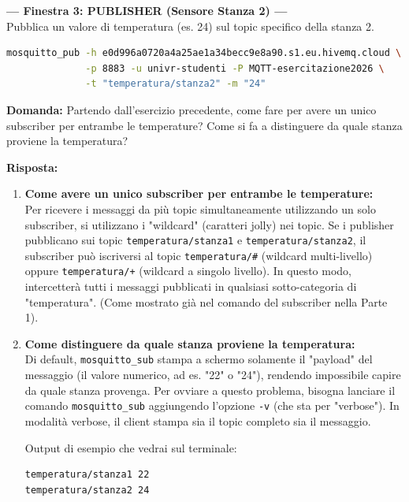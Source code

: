 \documentclass[11pt]{article}
\begin{document}
\begin{tcolorbox}[colback=green!5!white,colframe=green!75!black,title=\textbf{RISPOSTA}, breakable]
\textbf{--- Finestra 3: PUBLISHER (Sensore Stanza 2) ---}\\
Pubblica un valore di temperatura (es. 24) sul topic specifico della stanza 2.
\begin{lstlisting}[language=bash, basicstyle=\ttfamily\small]
mosquitto_pub -h e0d996a0720a4a25ae1a34becc9e8a90.s1.eu.hivemq.cloud \
              -p 8883 -u univr-studenti -P MQTT-esercitazione2026 \
              -t "temperatura/stanza2" -m "24"
\end{lstlisting}

\textbf{Domanda:} Partendo dall'esercizio precedente, come fare per avere un unico subscriber per entrambe le temperature? Come si fa a distinguere da quale stanza proviene la temperatura?

\textbf{Risposta:}
\begin{enumerate}
    \item \textbf{Come avere un unico subscriber per entrambe le temperature:}\\
    Per ricevere i messaggi da più topic simultaneamente utilizzando un solo subscriber, si utilizzano i "wildcard" (caratteri jolly) nei topic. Se i publisher pubblicano sui topic \texttt{temperatura/stanza1} e \texttt{temperatura/stanza2}, il subscriber può iscriversi al topic \texttt{temperatura/\#} (wildcard multi-livello) oppure \texttt{temperatura/+} (wildcard a singolo livello). In questo modo, intercetterà tutti i messaggi pubblicati in qualsiasi sotto-categoria di "temperatura". (Come mostrato già nel comando del subscriber nella Parte 1).

    \item \textbf{Come distinguere da quale stanza proviene la temperatura:}\\
    Di default, \texttt{mosquitto\_sub} stampa a schermo solamente il "payload" del messaggio (il valore numerico, ad es. "22" o "24"), rendendo impossibile capire da quale stanza provenga. Per ovviare a questo problema, bisogna lanciare il comando \texttt{mosquitto\_sub} aggiungendo l'opzione \texttt{-v} (che sta per "verbose"). In modalità verbose, il client stampa sia il topic completo sia il messaggio.
    
    Output di esempio che vedrai sul terminale:
\begin{verbatim}
temperatura/stanza1 22
temperatura/stanza2 24
\end{verbatim}
\end{enumerate}
\end{tcolorbox}
\end{document}
